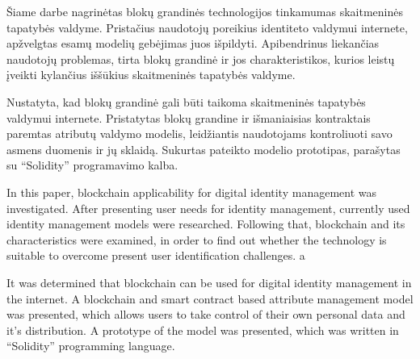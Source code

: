 
Šiame darbe nagrinėtas blokų grandinės technologijos tinkamumas skaitmeninės tapatybės valdyme. Pristačius naudotojų poreikius identiteto valdymui internete,
apžvelgtas esamų modelių gebėjimas juos išpildyti. Apibendrinus liekančias naudotojų problemas, tirta blokų grandinė ir jos charakteristikos,
kurios leistų įveikti kylančius iššūkius skaitmeninės tapatybės valdyme.

Nustatyta, kad blokų grandinė gali būti taikoma skaitmeninės tapatybės valdymui internete. Pristatytas blokų grandine ir išmaniaisias kontraktais
paremtas atributų valdymo modelis,
leidžiantis naudotojams kontroliuoti savo asmens duomenis ir jų sklaidą. Sukurtas pateikto modelio prototipas, parašytas su \enquote{Solidity}
programavimo kalba.



In this paper, blockchain applicability for digital identity management was investigated. After presenting user needs for identity management,
currently used identity management models were researched. Following that, blockchain and its characteristics were examined,
in order to find out whether the technology is suitable
to overcome present user identification challenges.   a

It was determined that blockchain can be used for digital identity management in the internet. A blockchain and smart contract based attribute management model was presented,
which allows users to take control of their own personal data and it's distribution. A prototype of the model was presented,
which was written in \enquote{Solidity} programming language.

